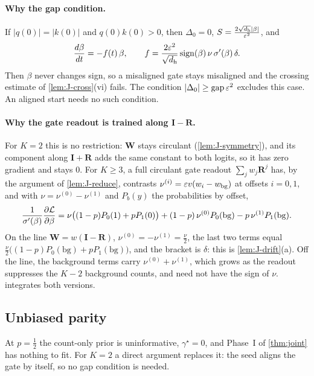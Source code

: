 \paragraph{Why the gap condition.}\label{rem:J-balance} If $|q(0)|=|k(0)|$ and $q(0)k(0)>0$, then $\Delta_0=0$, $S=\frac{2\sqrt{d_{\mathrm h}}|\beta|}{\varepsilon^2}$, and
\[
 \ddt{\beta}=-f(t)\,\beta,\qquad f=\frac{2\initscale^2}{\sqrt{d_{\mathrm h}}}\operatorname{sign}(\beta)\,\nu\,\sigma'(\beta)\,\delta .
\]
Then $\beta$ never changes sign, so a misaligned gate stays misaligned and the crossing estimate of \cref{lem:J-cross}(vi) fails. The condition
$|\Delta_0|\ge\mathrm{gap}\,\varepsilon^2$ excludes this case. An aligned start needs no such condition.

\paragraph{Why the gate readout is trained along $\mathbf I-\mathbf R$.}\label{rem:J-line} For $K=2$ this is no restriction: $\mathbf W$ stays circulant
(\cref{lem:J-symmetry}), and its component along $\mathbf I+\mathbf R$ adds the same constant to both logits, so it has zero gradient and stays $0$.
For $K\ge3$, a full circulant gate readout $\sum_jw_j\mathbf R^j$ has, by the argument of \cref{lem:J-reduce}, contrasts $\nu^{(i)}=\varepsilon v(w_i-w_{\mathrm{bg}})$
at offsets $i=0,1$, and with $\nu=\nu^{(0)}-\nu^{(1)}$ and $P_b(y)$ the probabilities by offset,
\[
 \frac{1}{\sigma'(\beta)}\pd{\mathcal L}{\beta}=\nu\bigl((1-p)P_0(1)+pP_1(0)\bigr)+(1-p)\,\nu^{(0)}P_0(\mathrm{bg})-p\,\nu^{(1)}P_1(\mathrm{bg}).
\]
On the line $\mathbf W=w(\mathbf I-\mathbf R)$, $\nu^{(0)}=-\nu^{(1)}=\frac{\nu}{2}$, the last two terms equal $\frac{\nu}{2}\bigl((1-p)P_0(\mathrm{bg})+pP_1(\mathrm{bg})\bigr)$, and the bracket is
$\delta$: this is \cref{lem:J-drift}(a). Off the line, the background terms carry $\nu^{(0)}+\nu^{(1)}$, which grows as the readout suppresses the $K-2$
background counts, and need not have the sign of $\nu$.  integrates both versions.


\subsection{Unbiased parity}
\label{app:J-half}
At $p=\frac12$ the count-only prior is uninformative, $\gamma^\star=0$, and Phase~I of \cref{thm:joint} has nothing to fit. For $K=2$ a direct argument
replaces it: the seed aligns the gate by itself, so no gap condition is needed.

